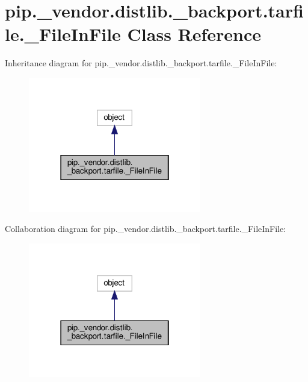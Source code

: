 \hypertarget{classpip_1_1__vendor_1_1distlib_1_1__backport_1_1tarfile_1_1__FileInFile}{}\section{pip.\+\_\+vendor.\+distlib.\+\_\+backport.\+tarfile.\+\_\+\+File\+In\+File Class Reference}
\label{classpip_1_1__vendor_1_1distlib_1_1__backport_1_1tarfile_1_1__FileInFile}


Inheritance diagram for pip.\+\_\+vendor.\+distlib.\+\_\+backport.\+tarfile.\+\_\+\+File\+In\+File\+:
\nopagebreak
\begin{figure}[H]
\begin{center}
\leavevmode
\includegraphics[width=214pt]{classpip_1_1__vendor_1_1distlib_1_1__backport_1_1tarfile_1_1__FileInFile__inherit__graph}
\end{center}
\end{figure}


Collaboration diagram for pip.\+\_\+vendor.\+distlib.\+\_\+backport.\+tarfile.\+\_\+\+File\+In\+File\+:
\nopagebreak
\begin{figure}[H]
\begin{center}
\leavevmode
\includegraphics[width=214pt]{classpip_1_1__vendor_1_1distlib_1_1__backport_1_1tarfile_1_1__FileInFile__coll__graph}
\end{center}
\end{figure}
